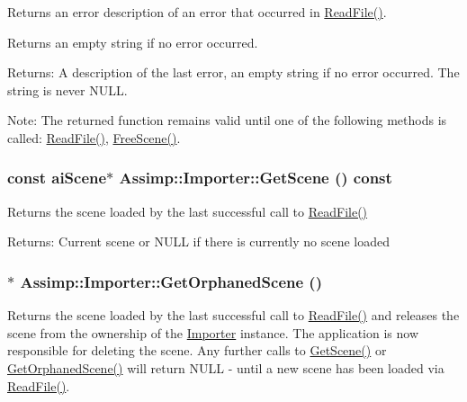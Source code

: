 Returns an error description of an error that occurred in \hyperlink{class_assimp_1_1_importer_174418ab41d5b8bc51a044895cb991e5}{ReadFile()}.

Returns an empty string if no error occurred. \begin{Desc}
\item[Returns:]A description of the last error, an empty string if no error occurred. The string is never NULL.\end{Desc}
\begin{Desc}
\item[Note:]The returned function remains valid until one of the following methods is called: \hyperlink{class_assimp_1_1_importer_174418ab41d5b8bc51a044895cb991e5}{ReadFile()}, \hyperlink{class_assimp_1_1_importer_53dafc3046abc33365a07c605716c5d4}{FreeScene()}. \end{Desc}
\hypertarget{class_assimp_1_1_importer_26fd479a6a955969c1377fa59f92db66}{
\subsubsection[GetScene]{\setlength{\rightskip}{0pt plus 5cm}const {\bf aiScene}$\ast$ Assimp::Importer::GetScene () const}}
\label{class_assimp_1_1_importer_26fd479a6a955969c1377fa59f92db66}


Returns the scene loaded by the last successful call to \hyperlink{class_assimp_1_1_importer_174418ab41d5b8bc51a044895cb991e5}{ReadFile()}

\begin{Desc}
\item[Returns:]Current scene or NULL if there is currently no scene loaded \end{Desc}
\hypertarget{class_assimp_1_1_importer_60eb9042fb85bfbd61a863e131a56ecd}{
\subsubsection[GetOrphanedScene]{$\ast$ Assimp::Importer::GetOrphanedScene ()}}
\label{class_assimp_1_1_importer_60eb9042fb85bfbd61a863e131a56ecd}


Returns the scene loaded by the last successful call to \hyperlink{class_assimp_1_1_importer_174418ab41d5b8bc51a044895cb991e5}{ReadFile()} and releases the scene from the ownership of the \hyperlink{class_assimp_1_1_importer}{Importer} instance. The application is now responsible for deleting the scene. Any further calls to \hyperlink{class_assimp_1_1_importer_26fd479a6a955969c1377fa59f92db66}{GetScene()} or \hyperlink{class_assimp_1_1_importer_60eb9042fb85bfbd61a863e131a56ecd}{GetOrphanedScene()} will return NULL - until a new scene has been loaded via \hyperlink{class_assimp_1_1_importer_174418ab41d5b8bc51a044895cb991e5}{ReadFile()}.

